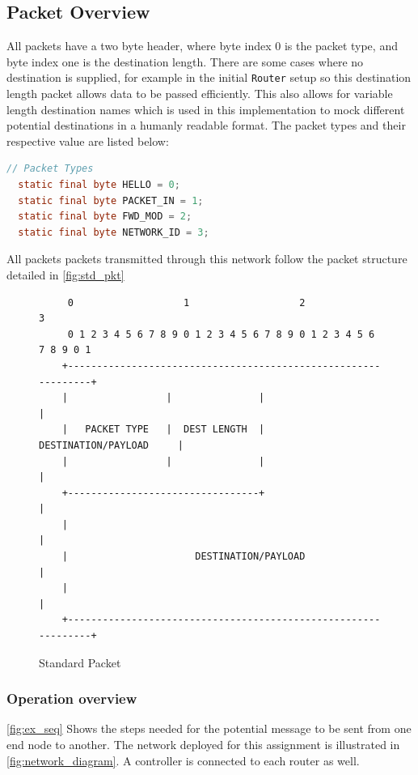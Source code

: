 \documentclass{article}
\newcommand{\code}[1]{\texttt{#1}}
\begin{document}
\subsection[Packet]{Packet Overview}
All packets have a two byte header, where byte index 0 is the packet type, and byte index one is the destination length. There are some cases where no destination is supplied, for example in the initial \code{Router} setup so this destination length packet allows data to be passed efficiently. This also allows for variable length destination names which is used in this implementation to mock different potential destinations in a humanly readable format. The packet types and their respective value are listed below:
\begin{lstlisting}[language=java,caption={[Encoded Packet Types]Code snippet from \code{Node} with the encoded packet types},label={lst:packet_types}]
  // Packet Types
  static final byte HELLO = 0;
  static final byte PACKET_IN = 1;
  static final byte FWD_MOD = 2;
  static final byte NETWORK_ID = 3;
\end{lstlisting}

All packets packets transmitted through this network follow the packet structure detailed in \autoref{fig:std_pkt}
\begin{figure}[!ht]
	\centering
	\begin{BVerbatim}
	 0                   1                   2                   3  
	 0 1 2 3 4 5 6 7 8 9 0 1 2 3 4 5 6 7 8 9 0 1 2 3 4 5 6 7 8 9 0 1
	+---------------------------------------------------------------+
	|                 |               |                             |
	|   PACKET TYPE   |  DEST LENGTH  |     DESTINATION/PAYLOAD     |
	|                 |               |                             |
	+---------------------------------+                             |
	|                                                               |
	|                      DESTINATION/PAYLOAD                      |
	|                                                               |
	+---------------------------------------------------------------+
	\end{BVerbatim}
	\caption{Standard Packet}
	\label{fig:std_pkt}
\end{figure}

\subsubsection[Operation]{Operation overview}
\autoref{fig:ex_seq} Shows the steps needed for the potential message to be sent from one end node to another.
The network deployed for this assignment is illustrated in \autoref{fig:network_diagram}. A controller is connected to each router as well.
\end{document}
